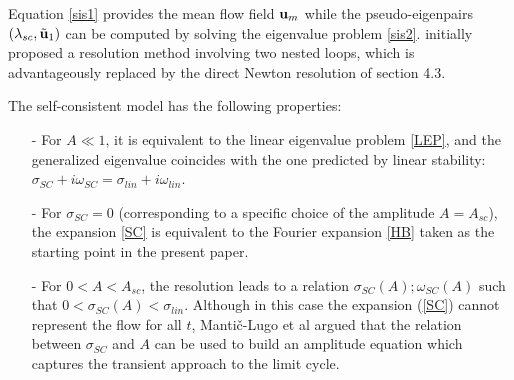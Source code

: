 \documentclass[twocolumn,10pt]{asme2ej}
\begin{document}
Equation \eqref{sis1} provides the mean flow field ${\bf u }_m$ while the 
pseudo-eigenpairs $(\lambda_{sc},  \tilde{{\bf u }}_1)$ can be computed by solving the eigenvalue problem \eqref{sis2}.
\cite{MLugo2014} initially proposed a resolution method involving two nested loops, which is advantageously replaced by
the direct Newton resolution of section 4.3. 


The self-consistent model has the following properties:
\begin{itemize}
\item[-] For $ A \ll 1$, it is equivalent to the linear eigenvalue problem \eqref{LEP}, and the generalized eigenvalue coincides with the one predicted by linear stability: $\sigma_{SC} + i \omega_{SC} = \sigma_{lin} + i \omega_{lin}$.
\item[-] For $\sigma_{SC}=0$ (corresponding to a specific choice of the amplitude $A=A_{sc}$), the expansion \eqref{SC} is equivalent to 
the Fourier expansion \eqref{HB} taken as the starting point in the present paper. 
\item[-] For $0<A<A_{sc}$, the resolution leads to a relation $\sigma_{SC}(A) ; \omega_{SC}(A)$
such that $0< \sigma_{SC}(A) < \sigma_{lin}$.
 Although in this case the expansion ({\ref{SC}}) cannot represent the flow for all $t$, Manti\v{c}-Lugo et al \cite{MLugo2014} argued that the relation between $\sigma_{SC}$ and $A$ can be used to build an amplitude equation which captures the transient approach to the limit cycle. 
\end{itemize}

\end{document}
